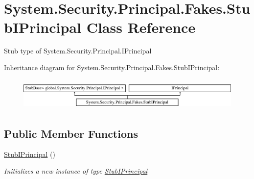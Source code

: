 \hypertarget{class_system_1_1_security_1_1_principal_1_1_fakes_1_1_stub_i_principal}{\section{System.\-Security.\-Principal.\-Fakes.\-Stub\-I\-Principal Class Reference}
\label{class_system_1_1_security_1_1_principal_1_1_fakes_1_1_stub_i_principal}
}


Stub type of System.\-Security.\-Principal.\-I\-Principal 


Inheritance diagram for System.\-Security.\-Principal.\-Fakes.\-Stub\-I\-Principal\-:\begin{figure}[H]
\begin{center}
\leavevmode
\includegraphics[height=1.661721cm]{class_system_1_1_security_1_1_principal_1_1_fakes_1_1_stub_i_principal}
\end{center}
\end{figure}
\subsection*{Public Member Functions}
\begin{DoxyCompactItemize}
\item 
\hyperlink{class_system_1_1_security_1_1_principal_1_1_fakes_1_1_stub_i_principal_aa4e7621f0c3a4b1f6eae5ee67e76736f}{Stub\-I\-Principal} ()
\begin{DoxyCompactList}\small\item\em Initializes a new instance of type \hyperlink{class_system_1_1_security_1_1_principal_1_1_fakes_1_1_stub_i_principal}{Stub\-I\-Principal}\end{DoxyCompactList}\end{DoxyCompactItemize}
